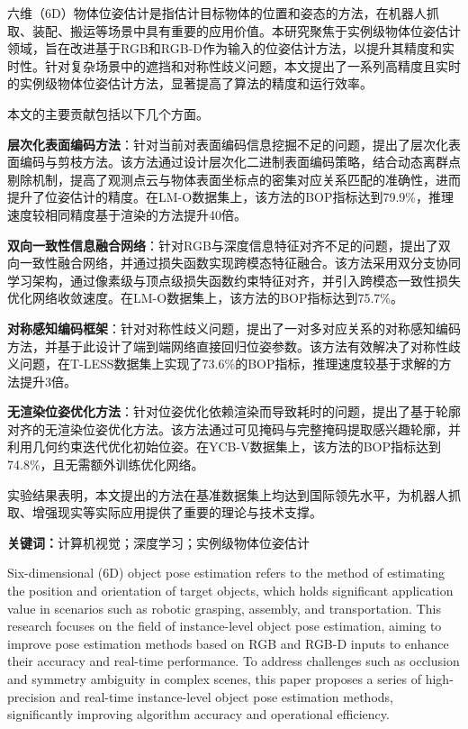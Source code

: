\cleardoublepage
{}
\par 六维（6D）物体位姿估计是指估计目标物体的位置和姿态的方法，在机器人抓取、装配、搬运等场景中具有重要的应用价值。本研究聚焦于实例级物体位姿估计领域，旨在改进基于RGB和RGB-D作为输入的位姿估计方法，以提升其精度和实时性。针对复杂场景中的遮挡和对称性歧义问题，本文提出了一系列高精度且实时的实例级物体位姿估计方法，显著提高了算法的精度和运行效率。
\par 本文的主要贡献包括以下几个方面。
\par \textbf{层次化表面编码方法}：针对当前对表面编码信息挖掘不足的问题，提出了层次化表面编码与剪枝方法。该方法通过设计层次化二进制表面编码策略，结合动态离群点剔除机制，提高了观测点云与物体表面坐标点的密集对应关系匹配的准确性，进而提升了位姿估计的精度。在LM-O数据集上，该方法的BOP指标达到79.9\%，推理速度较相同精度基于渲染的方法提升40倍。
\par \textbf{双向一致性信息融合网络}：针对RGB与深度信息特征对齐不足的问题，提出了双向一致性融合网络，并通过损失函数实现跨模态特征融合。该方法采用双分支协同学习架构，通过像素级与顶点级损失函数约束特征对齐，并引入跨模态一致性损失优化网络收敛速度。在LM-O数据集上，该方法的BOP指标达到75.7\%。
\par \textbf{对称感知编码框架}：针对对称性歧义问题，提出了一对多对应关系的对称感知编码方法，并基于此设计了端到端网络直接回归位姿参数。该方法有效解决了对称性歧义问题，在T-LESS数据集上实现了73.6\%的BOP指标，推理速度较基于求解的方法提升3倍。
\par \textbf{无渲染位姿优化方法}：针对位姿优化依赖渲染而导致耗时的问题，提出了基于轮廓对齐的无渲染位姿优化方法。该方法通过可见掩码与完整掩码提取感兴趣轮廓，并利用几何约束迭代优化初始位姿。在YCB-V数据集上，该方法的BOP指标达到74.8\%，且无需额外训练优化网络。
\par 实验结果表明，本文提出的方法在基准数据集上均达到国际领先水平，为机器人抓取、增强现实等实际应用提供了重要的理论与技术支撑。
\par \textbf{关键词：}计算机视觉；深度学习；实例级物体位姿估计
\cleardoublepage
{}
\par Six-dimensional (6D) object pose estimation refers to the method of estimating the position and orientation of target objects, which holds significant application value in scenarios such as robotic grasping, assembly, and transportation. This research focuses on the field of instance-level object pose estimation, aiming to improve pose estimation methods based on RGB and RGB-D inputs to enhance their accuracy and real-time performance. To address challenges such as occlusion and symmetry ambiguity in complex scenes, this paper proposes a series of high-precision and real-time instance-level object pose estimation methods, significantly improving algorithm accuracy and operational efficiency.
